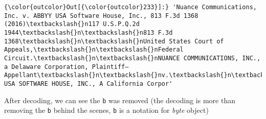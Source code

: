 \documentclass[10.5pt,landscape]{article}
\begin{document}
\begin{Verbatim}[commandchars=\\\{\}]
{\color{outcolor}Out[{\color{outcolor}233}]:} 'Nuance Communications, Inc. v. ABBYY USA Software House, Inc., 813 F.3d 1368 (2016)\textbackslash{}n117 U.S.P.Q.2d 1944\textbackslash{}n\textbackslash{}n813 F.3d 1368\textbackslash{}n\textbackslash{}nUnited States Court of Appeals,\textbackslash{}n\textbackslash{}nFederal Circuit.\textbackslash{}n\textbackslash{}nNUANCE COMMUNICATIONS, INC., a Delaware Corporation, Plaintiff–Appellant\textbackslash{}n\textbackslash{}nv.\textbackslash{}n\textbackslash{}nABBYY USA SOFTWARE HOUSE, INC., A California Corpor'
\end{Verbatim}
            
    After decoding, we can see the \texttt{b} was removed (the decoding is
more than removing the \texttt{b} behind the scenes, \texttt{b} is a
notation for \emph{byte} object)
\end{document}
